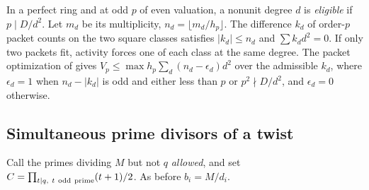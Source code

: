 \documentclass[11pt]{amsart}
\numberwithin{equation}{section}
\theoremstyle{definition}
\theoremstyle{plain}
\begin{document}
In a perfect ring and at odd $p$ of even valuation, a nonunit degree
$d$ is \emph{eligible} if $p\mid D/d^2$. Let $m_d$ be its multiplicity,
$n_d=\lfloor m_d/h_p\rfloor$. The difference $k_d$ of order-$p$
packet counts on the two square classes satisfies $|k_d|\le n_d$ and
$\sum k_dd^2=0$. If only two packets fit, activity forces one of each
class at the same degree. The packet optimization of \cite[\S19.4]{BDPcore} gives $V_p\le\max h_p\sum_d(n_d-\epsilon_d)d^2$ over the admissible
$k_d$, where $\epsilon_d=1$ when $n_d-|k_d|$ is odd and either less
than $p$ or $p^2\nmid D/d^2$, and $\epsilon_d=0$ otherwise.

\subsection{Simultaneous prime divisors of a twist}\label{sec:spherical}
Call the primes dividing $M$ but not $q$ \emph{allowed}, and set
$C=\prod_{t\mid q,\ t\ {\rm odd\ prime}}(t+1)/2$.
As before $b_i=M/d_i$.
\end{document}
